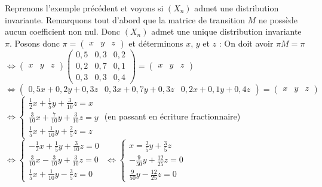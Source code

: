 	\begin{tip}[Exemple]
		Reprenons l'exemple précédent et voyons si $(X_n)$ admet une distribution invariante.
		\newpar
		Remarquons tout d'abord que la matrice de transition $M$ ne possède aucun coefficient non nul. Donc $(X_n)$ admet une unique distribution invariante $\pi$.
		\newpar
		Posons donc $\pi = \begin{pmatrix} x & y & z \end{pmatrix}$ et déterminons $x$, $y$ et $z$ :
		\newpar
		On doit avoir $\pi M = \pi$
		\newline
		$\iff \begin{pmatrix} x & y & z \end{pmatrix} \begin{pmatrix} 0,5 & 0,3 & 0,2 \\ 0,2 & 0,7 & 0,1 \\ 0,3 & 0,3 & 0,4 \end{pmatrix} = \begin{pmatrix} x & y & z \end{pmatrix}$
		\newline
		$\iff \begin{pmatrix} 0,5x + 0,2y + 0,3z & 0,3x + 0,7y + 0,3z & 0,2x + 0,1y + 0,4z \end{pmatrix} = \begin{pmatrix} x & y & z \end{pmatrix}$
		\newline
		$\iff \begin{cases} \frac{1}{2}x + \frac{1}{5}y + \frac{3}{10}z = x \\ \frac{3}{10}x + \frac{7}{10}y + \frac{3}{10}z = y \\ \frac{1}{5}x + \frac{1}{10}y + \frac{2}{5}z = z \end{cases}$ (en passant en écriture fractionnaire)
		\newline
		$\iff \begin{cases} -\frac{1}{2}x + \frac{1}{5}y + \frac{3}{10}z = 0 \\ \frac{3}{10}x - \frac{3}{10}y + \frac{3}{10}z = 0 \\ \frac{1}{5}x + \frac{1}{10}y - \frac{3}{5}z = 0 \end{cases}$
		\newline
		$\iff \begin{cases} x = \frac{2}{5}y + \frac{3}{5}z \\ -\frac{9}{50}y + \frac{12}{25}z = 0 \\ \frac{9}{50}y - \frac{12}{25}z = 0 \end{cases}$

\end{tip}

